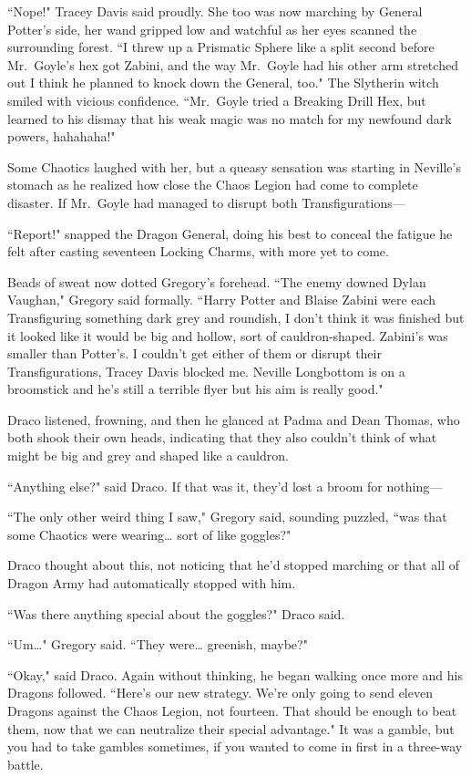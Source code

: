``Nope!" Tracey Davis said proudly. She too was now marching by General Potter's side, her wand gripped low and watchful as her eyes scanned the surrounding forest. ``I threw up a Prismatic Sphere like a split second before Mr.~Goyle's hex got Zabini, and the way Mr.~Goyle had his other arm stretched out I think he planned to knock down the General, too." The Slytherin witch smiled with vicious confidence. ``Mr.~Goyle tried a Breaking Drill Hex, but learned to his dismay that his weak magic was no match for my newfound dark powers, hahahaha!"

Some Chaotics laughed with her, but a queasy sensation was starting in Neville's stomach as he realized how close the Chaos Legion had come to complete disaster. If Mr.~Goyle had managed to disrupt both Transfigurations—

\later

``Report!" snapped the Dragon General, doing his best to conceal the fatigue he felt after casting seventeen Locking Charms, with more yet to come.

Beads of sweat now dotted Gregory's forehead. ``The enemy downed Dylan Vaughan," Gregory said formally. ``Harry Potter and Blaise Zabini were each Transfiguring something dark grey and roundish, I don't think it was finished but it looked like it would be big and hollow, sort of cauldron-shaped. Zabini's was smaller than Potter's. I couldn't get either of them or disrupt their Transfigurations, Tracey Davis blocked me. Neville Longbottom is on a broomstick and he's still a terrible flyer but his aim is really good."

Draco listened, frowning, and then he glanced at Padma and Dean Thomas, who both shook their own heads, indicating that they also couldn't think of what might be big and grey and shaped like a cauldron.

``Anything else?" said Draco. If that was it, they'd lost a broom for nothing—

``The only other weird thing I saw," Gregory said, sounding puzzled, ``was that some Chaotics were wearing{\ldots} sort of like goggles?"

Draco thought about this, not noticing that he'd stopped marching or that all of Dragon Army had automatically stopped with him.

``Was there anything special about the goggles?" Draco said.

``Um{\ldots}" Gregory said. ``They were{\ldots} greenish, maybe?"

``Okay," said Draco. Again without thinking, he began walking once more and his Dragons followed. ``Here's our new strategy. We're only going to send eleven Dragons against the Chaos Legion, not fourteen. That should be enough to beat them, now that we can neutralize their special advantage." It was a gamble, but you had to take gambles sometimes, if you wanted to come in first in a three-way battle.

